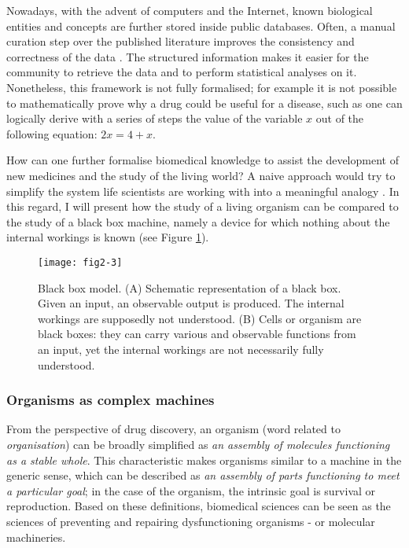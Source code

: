 Nowadays, with the advent of computers and the Internet, known biological entities and concepts are further stored inside public databases. Often, a manual curation step over the published literature improves the consistency and correctness of the data \citep{brooksbank2014european}. The structured information makes it easier for the community to retrieve the data and to perform statistical analyses on it. Nonetheless, this framework is not fully formalised; for example it is not possible to mathematically prove why a drug could be useful for a disease, such as one can logically derive with a series of steps the value of the variable $ x $ out of the following equation: $ 2x = 4 + x $.

How can one further formalise biomedical knowledge to assist the development of new medicines and the study of the living world? A naive approach would try to simplify the system life scientists are working with into a meaningful analogy \citep{lazebnik2002can}. In this regard, I will present how the study of a living organism can be compared to the study of a black box machine, namely a device for which nothing about the internal workings is known (see Figure \ref{fig2-3}).

\begin{figure}[ht]
    \centering
    \texttt{[image: fig2-3]}
    \caption{Black box model. (A) Schematic representation of a black box. Given an input, an observable output is produced. The internal workings are supposedly not understood. (B) Cells or organism are black boxes: they can carry various and observable functions from an input, yet the internal workings are not necessarily fully understood.}
    \label{fig2-3}
\end{figure}

\subsubsection{Organisms as complex machines}

From the perspective of drug discovery, an organism (word related to \emph{organisation}) can be broadly simplified as \emph{an assembly of molecules functioning as a stable whole}. This characteristic makes organisms similar to a machine in the generic sense, which can be described as \emph{an assembly of parts functioning to meet a particular goal}; in the case of the organism, the intrinsic goal is survival or reproduction. Based on these definitions, biomedical sciences can be seen as the sciences of preventing and repairing dysfunctioning organisms - or molecular machineries.

